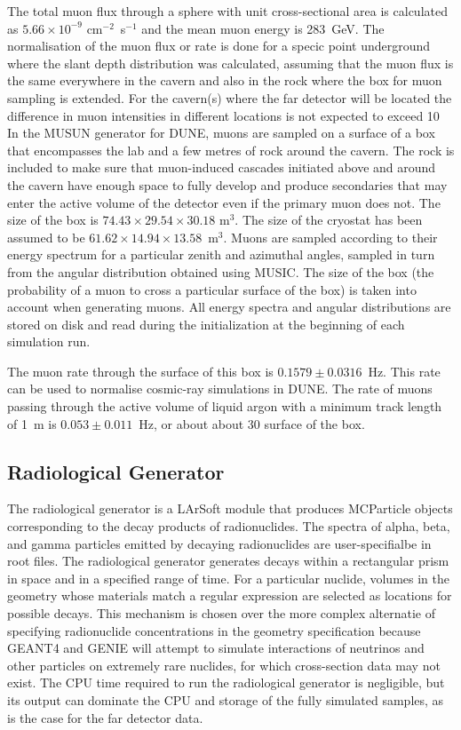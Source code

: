 The total muon flux through a sphere with unit cross-sectional area is calculated as $5.66\times
10^{-9}$ cm$^{-2}$~s$^{-1}$ and the mean muon energy is 283~GeV.
The normalisation of the muon flux or rate is done for a specic point underground where
the slant depth distribution was calculated, assuming that the muon flux is the same 
everywhere in the cavern and also in the
rock where the box for muon sampling is extended. For the cavern(s) where the far
detector will be located the difference in muon intensities in different locations is not
expected to exceed 10%
In the MUSUN generator for DUNE, muons are sampled on a surface of a box that
encompasses the lab and a few metres of rock around the cavern. The rock is 
included to make sure that muon-induced cascades initiated above and around the cavern
have enough space to fully develop and produce secondaries that may enter the active volume
of the detector even if the primary muon does not.
The size of the box is $74.43\times29.54\times30.18$ m$^{3}$. The size of
the cryostat has been assumed to be $61.62\times14.94\times13.58$~m$^{3}$.
Muons are sampled according to their energy spectrum for a particular zenith and 
azimuthal angles, sampled in turn from the angular distribution obtained using MUSIC. 
The size of the box (the probability of a muon to cross a particular
surface of the box) is taken into account when generating muons. All energy spectra 
and angular distributions are stored on disk and read during the initialization at
the beginning of each simulation run. 

The muon rate through the surface of this box is $0.1579\pm 0.0316$~Hz. This rate can be used
to normalise cosmic-ray simulations in DUNE. The rate of muons passing through
the active volume of liquid argon with a minimum track length of 1~m 
is $0.053\pm 0.011$~Hz, or about about 30%
surface of the box.


\subsection{Radiological Generator}

The radiological generator is a LArSoft module that produces MCParticle objects corresponding
to the decay products of radionuclides.  The spectra of alpha, beta, and gamma particles emitted
by decaying radionuclides are user-specifialbe in root files.  The radiological generator generates
decays within a rectangular prism in space and in a specified range of time.  For a particular
nuclide, volumes in the geometry whose materials match a regular expression are selected as locations
for possible decays.  This mechanism is chosen over the more complex alternatie of specifying radionuclide
concentrations in the geometry specification because GEANT4 and GENIE will attempt to simulate interactions
of neutrinos and other particles on extremely rare nuclides, for which cross-section data may not exist.
The CPU time required to run the radiological generator is negligible, but its output can dominate
the CPU and storage of the fully simulated samples, as is the case for the far detector data.

